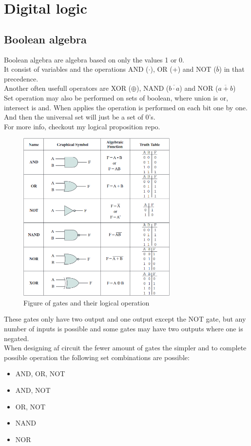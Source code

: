 \documentclass[12pt, a4paper]{article}
\begin{document}
	\section{Digital logic}
		\subsection{Boolean algebra}
			Boolean algebra are algebra based on only the values 1 or 0.\\
			It consist of variables and the operations AND ($\cdot$), OR (+) and NOT ($\overline{b}$) in that precedence.\\
			Another often usefull operators are XOR ($\oplus$), NAND ($\overline{b\cdot a}$) and NOR ($\overline{a+b}$)\\
			Set operation may also be performed on sets of boolean, where union is or, intersect is and. When applies the operation is performed on each bit one by one.\\
			And then the universal set will just be a set of 0's.\\
			For more info, checkout my logical proposition repo.\\
			\begin{figure}[h!]
				\includegraphics[width=300px]{assets/gates.png}
				\centering
				\caption{Figure of gates and their logical operation}
			\end{figure}
			These gates only have two output and one output except the NOT gate, but any number of inputs is possible and some gates may have two outputs where one is negated.\\
			When designing af circuit the fewer amount of gates the simpler and to complete possible operation the following set combinations are possible:
			\begin{itemize}
				\item AND, OR, NOT
				\item AND, NOT
				\item OR, NOT
				\item NAND
				\item NOR
			\end{itemize}
\end{document}
